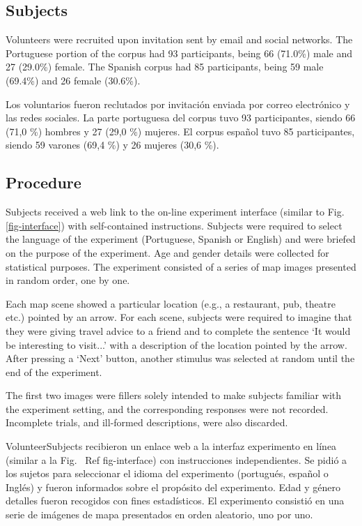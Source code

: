 \subsection{Subjects}

Volunteers were recruited upon  invitation sent by email and social networks. The Portuguese portion of the corpus had 93 participants, being 66 (71.0\%) male and 27 (29.0\%) female. The Spanish corpus had 85 participants, being 59 male (69.4\%) and 26 female (30.6\%).

Los voluntarios fueron reclutados por invitaci\'on enviada por correo electr\'onico y las redes sociales. La parte portuguesa del corpus tuvo 93 participantes, siendo 66 (71,0 \%) hombres y 27 (29,0 \%) mujeres. El corpus espa\~nol tuvo 85 participantes, siendo 59 varones (69,4 \%) y 26 mujeres (30,6 \%).
\subsection{Procedure}

Subjects received a web link to the on-line experiment interface (similar to Fig. \ref{fig-interface}) with self-contained instructions. Subjects were required to select the language of the experiment (Portuguese, Spanish or English) and were briefed on the purpose of the experiment. Age and gender details were collected for statistical purposes. The experiment consisted of a series of map images presented in random order, one by one. 

Each map scene showed a particular location (e.g., a restaurant, pub, theatre etc.) pointed by an arrow. For each scene, subjects were required to imagine that they were giving travel advice to a friend and to complete the sentence `It would be interesting to visit...' with a description of the location pointed by the arrow. After pressing a `Next' button, another stimulus was selected at random until the end of the experiment. 

The first two images were fillers solely intended to make subjects familiar with the experiment setting, and the corresponding responses were not recorded. Incomplete trials, and ill-formed descriptions, were also discarded. 

VolunteerSubjects recibieron un enlace web a la interfaz experimento en l\'{i}nea (similar a la Fig. \ Ref {fig-interface}) con instrucciones independientes. Se pidi\'o a los sujetos para seleccionar el idioma del experimento (portugu\'es, espa\~nol o Ingl\'es) y fueron informados sobre el prop\'osito del experimento. Edad y g\'enero detalles fueron recogidos con fines estad\'{i}sticos. El experimento consisti\'o en una serie de im\'agenes de mapa presentados en orden aleatorio, uno por uno.

